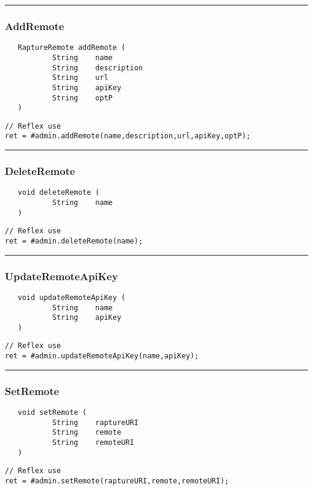 \rule{15cm}{2pt}
\subsubsection{AddRemote}
\label{Api:AddRemote}
\begin{verbatim}
   RaptureRemote addRemote (
           String    name
           String    description
           String    url
           String    apiKey
           String    optP
   )
\end{verbatim}
\begin{lstlisting}[language=reflex]
// Reflex use
ret = #admin.addRemote(name,description,url,apiKey,optP);
\end{lstlisting}



\rule{15cm}{2pt}
\subsubsection{DeleteRemote}
\label{Api:DeleteRemote}
\begin{verbatim}
   void deleteRemote (
           String    name
   )
\end{verbatim}
\begin{lstlisting}[language=reflex]
// Reflex use
ret = #admin.deleteRemote(name);
\end{lstlisting}



\rule{15cm}{2pt}
\subsubsection{UpdateRemoteApiKey}
\label{Api:UpdateRemoteApiKey}
\begin{verbatim}
   void updateRemoteApiKey (
           String    name
           String    apiKey
   )
\end{verbatim}
\begin{lstlisting}[language=reflex]
// Reflex use
ret = #admin.updateRemoteApiKey(name,apiKey);
\end{lstlisting}



\rule{15cm}{2pt}
\subsubsection{SetRemote}
\label{Api:SetRemote}
\begin{verbatim}
   void setRemote (
           String    raptureURI
           String    remote
           String    remoteURI
   )
\end{verbatim}
\begin{lstlisting}[language=reflex]
// Reflex use
ret = #admin.setRemote(raptureURI,remote,remoteURI);
\end{lstlisting}



